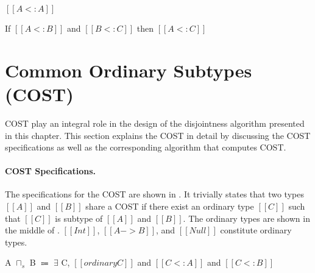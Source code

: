 \begin{lemma}
  $[[A <: A]]$
\label{lemma:union:cost:sub:refl}
\end{lemma}

\begin{lemma}
  If $[[A <: B]]$ and $[[B <: C]]$ then $[[A <: C]]$
\label{lemma:union:cost:sub:trans}
\end{lemma}






\section{Common Ordinary Subtypes (COST)}

COST play an integral role in the design of the disjointness algorithm
presented in this chapter. This section explains the COST in
detail by discussing the COST specifications as well as
the corresponding algorithm that computes COST.

\paragraph{COST Specifications.}
The specifications for the COST are shown in .
It trivially states that two types $[[A]]$ and $[[B]]$
share a COST if there exist an ordinary type $[[C]]$
such that $[[C]]$ is subtype of $[[A]]$ and $[[B]]$.
The ordinary types are shown in the middle of .
$[[Int]]$, $[[A->B]]$, and $[[Null]]$ constitute ordinary types.


\begin{definition}
\label{cost:specs:def}
    A $\sqcap_s$ B $\Coloneqq$ $\exists$ C, $[[ordinary C]]$ and $[[C <: A]]$ and $[[C <: B]]$ \\
\end{definition}

